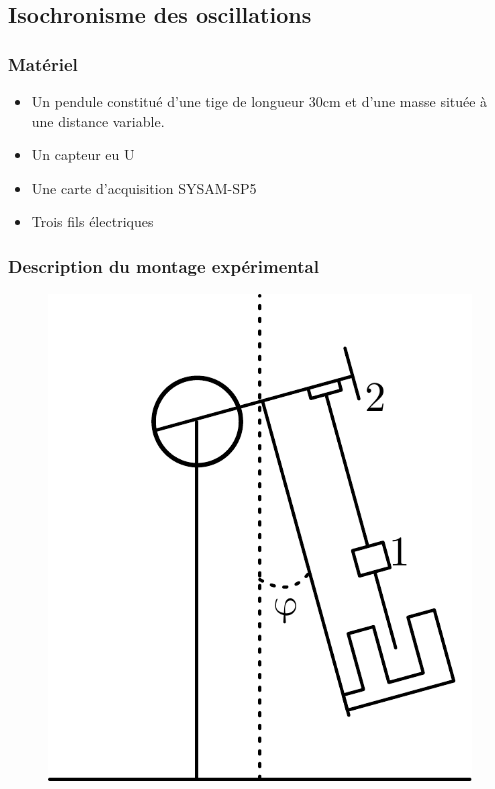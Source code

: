 \documentclass[a4paper,10pt,french]{scrartcl}
\begin{document}
\subsection{Isochronisme des oscillations}
\subsubsection{Matériel}
\begin{itemize}
 \item Un pendule constitué d'une tige de longueur 30cm et d'une masse située à une distance variable.
 \item Un capteur eu U
 \item Une carte d'acquisition SYSAM-SP5
 \item Trois fils électriques
\end{itemize}
\subsubsection{Description du montage expérimental}
\begin{figure}[H]
\begin{center}
 \includegraphics[scale=0.5]{schema}
 \end{center}
\end{figure}
\end{document}

